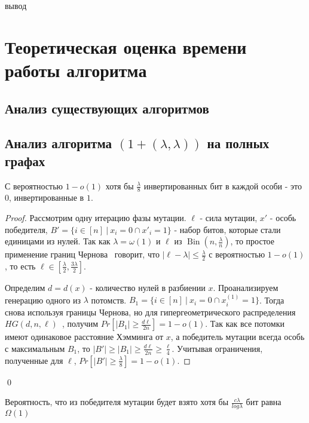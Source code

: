 \documentclass[times]{itmo-student-thesis}
\newcommand{\alglambda}{${(1 + (\lambda , \lambda))}$\xspace}
\DeclareMathOperator{\Bin}{Bin}
\begin{document}
вывод

\chapter{Теоретическая оценка времени работы алгоритма}

\section{Анализ существующих алгоритмов}

\section{Анализ алгоритма \alglambda на полных графах}

\begin{lemma}\label{lem:mut1}
С вероятностью $1- o(1)$ хотя бы $\frac{\lambda}{8}$ инвертированных бит в каждой особи - это $0$, инвертированные в $1$.
\end{lemma}

\begin{proof}
Рассмотрим одну итерацию фазы мутации. $\ell$ - сила мутации, $x'$ - особь победителя, $B' = \{i \in [n] ~|~ x_i = 0 \cap x'_i = 1\}$ - набор битов, которые стали единицами из нулей.
Так как $\lambda = \omega(1)$ и $\ell$ из $\Bin\left(n, \frac{\lambda}{n}\right)$, то простое применение границ Чернова~\cite{ссылка} говорит, что $|\ell - \lambda| \le \frac{\lambda}{2}$ с вероятностью $1- o(1)$, то есть $\ell \in [\frac{\lambda}{2}, \frac{3\lambda}{2}]$.

Определим $d = d(x)$ - количество нулей в разбиении $x$. Проанализируем генерацию одного из $\lambda$ потомств. $B_1 = \{i \in [n] ~|~ x_i = 0 \cap x^{(1)}_i = 1\}$. Тогда снова используя границы Чернова, но для гипергеометрического распределения $HG(d, n, \ell)$~\cite{ссылка}, получим $Pr[|B_1| \ge \frac{d\ell}{2n}] = 1 - o(1)$.
Так как все потомки имеют одинаковое расстояние Хэмминга от $x$, а победитель мутации всегда особь с максимальным $B_1$, то $|B'| \ge |B_1| \ge \frac{d\ell}{2n} \ge \frac{\ell}{4}$. Учитывая ограничения, полученные для $\ell$, $Pr[|B'| \ge \frac{\lambda}{8}] = 1 - o(1)$.
\end{proof}\qed

\begin{lemma}\label{lem:mut2}
Вероятность, что из победителя мутации будет взято хотя бы $\frac{c\lambda}{log\lambda}$ бит равна $\Omega(1)$
\end{lemma}
\end{document}
